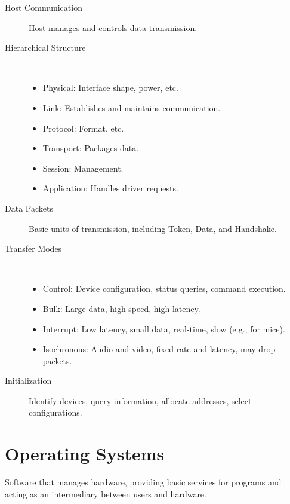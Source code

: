 \documentclass[11pt,journal,compsoc]{IEEEtran}
\begin{document}
\begin{description}
    \item[Host Communication] Host manages and controls data transmission.
    
    \item[Hierarchical Structure] ~
    
        \begin{itemize}
            \item Physical: Interface shape, power, etc.
            \item Link: Establishes and maintains communication.
            \item Protocol: Format, etc.
            \item Transport: Packages data.
            \item Session: Management.
            \item Application: Handles driver requests.
        \end{itemize}
    
    \item[Data Packets] Basic units of transmission, including Token, Data, and Handshake.
    
    \item[Transfer Modes] ~
    
        \begin{itemize}
            \item Control: Device configuration, status queries, command execution.
            \item Bulk: Large data, high speed, high latency.
            \item Interrupt: Low latency, small data, real-time, slow (e.g., for mice).
            \item Isochronous: Audio and video, fixed rate and latency, may drop packets.
        \end{itemize}
    
    \item[Initialization] Identify devices, query information, allocate addresses, select configurations.
\end{description}


\section{Operating Systems}

Software that manages hardware, providing basic services for programs and acting as an intermediary between users and hardware.
\end{document}
